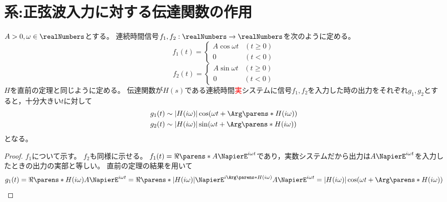         \section{系:正弦波入力に対する伝達関数の作用}
            \begin{shadebox}
                $A>0,\omega \in \realNumbers$とする。
                連続時間信号$f_1,f_2: \realNumbers \to \realNumbers$を次のように定める。
                \[
                    f_1(t) =
                    \begin{cases}
                        A\cos\omega t & (t\geq 0) \\
                        0 & (t<0)
                    \end{cases}
                \]
                \[
                    f_2(t) =
                    \begin{cases}
                        A\sin\omega t & (t\geq 0) \\
                        0 & (t<0)
                    \end{cases}
                \]
                $H$を直前の定理と同じように定める。
                伝達関数が$H(s)$である連続時間\textcolor{red}{実}システムに信号$f_1,f_2$を入力した時の出力をそれぞれ$g_1,g_2$とすると，十分大きい$t$に対して
                \begin{align*}
                    g_1(t) &\sim |H(i\omega)|\cos(\omega t + \Arg\parens*{H(i\omega)}) \\
                    g_2(t) &\sim |H(i\omega)|\sin(\omega t + \Arg\parens*{H(i\omega)})
                \end{align*}
                となる。
            \end{shadebox}
            \begin{proof}
                $f_1$について示す。
                $f_2$も同様に示せる。
                $f_1(t) = \Re\parens*{A\NapierE^{i\omega t}}$であり，実数システムだから出力は$A\NapierE^{i\omega t}$を入力したときの出力の実部と等しい。
                直前の定理の結果を用いて
                \[ g_1(t) = \Re\parens*{H(i\omega)A\NapierE^{i\omega t}} = \Re\parens*{|H(i\omega)|\NapierE^{i\Arg\parens*{H(i\omega)}}A\NapierE^{i\omega t}} = |H(i\omega)|\cos (\omega t + \Arg\parens*{H(i\omega)}) \]
            \end{proof}
